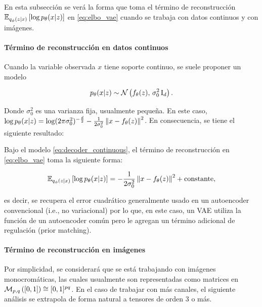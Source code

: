 En esta subsección se verá la forma que toma el término de reconstrucción $\mathbb{E}_{q_\phi(z|x)}\left[\log p_\theta(x|z)\right]$ en \eqref{eq:elbo_vae} cuando se trabaja con datos continuos y con imágenes.

\paragraph{Término de reconstrucción en datos continuos}

Cuando la variable observada $x$ tiene soporte continuo, se suele proponer un modelo

\begin{equation}
    \label{eq:decoder_continuous}
    p_\theta(x|z)\sim\mathcal{N}\left(f_\theta(z),\,\sigma_0^2\operatorname{I}_{d}\right).
\end{equation}

Donde $\sigma_0^2$ es una varianza fija, usualmente pequeña. En este caso, $\log p_\theta(x|z) = \log (2\pi\sigma_0^2)^{-\frac{d}{2}} - \frac{1}{2\sigma_0^2}\left\lVert x-f_\theta(z) \right\rVert^2$. En consecuencia, se tiene el siguiente resultado:

\begin{prop}
    Bajo el modelo \eqref{eq:decoder_continuous}, el término de reconstrucción en \eqref{eq:elbo_vae} toma la siguiente forma:

    \begin{equation*}
        \mathbb{E}_{q_\phi(z|x)}\left[\log p_\theta(x|z)\right] = -\frac{1}{2\sigma_0^2} \left\lVert x-f_\theta(z) \right\rVert^2 + \operatorname{constante},
    \end{equation*}

    es decir, se recupera el error cuadrático generalmente usado en un autoencoder convencional (i.e., no variacional) por lo que, en este caso, un VAE utiliza la función de un autoencoder común pero le agregan un término adicional de regulación (prior matching).
\end{prop}

\paragraph{Término de reconstrucción en imágenes}

Por simplicidad, se considerará que se está trabajando con imágenes monocromáticas, las cuales usualmente son representadas como matrices en $\mathcal{M}_{p,q}\left([0,1]\right)\cong [0,1]^{pq}$. En el caso de trabajar con más canales, el siguiente análisis se extrapola de forma natural a tensores de orden 3 o más.

